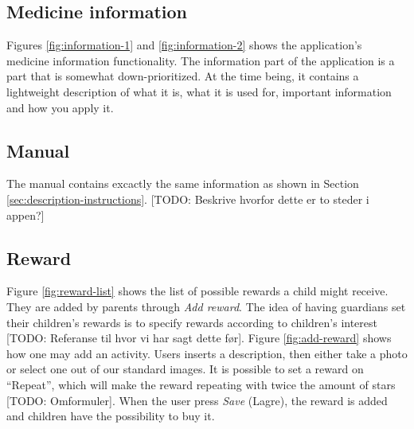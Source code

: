 \subsection{Medicine information}
\label{sec:description-medicine-information}
Figures \ref{fig:information-1} and \ref{fig:information-2} shows the application's medicine information functionality. The information part of the application is a part that is somewhat down-prioritized. At the time being, it contains a lightweight description of what it is, what it is used for, important information and how you apply it. 


\subsection{Manual}
\label{sec:description-manual}
The manual contains excactly the same information as shown in Section \ref{sec:description-instructions}. [TODO: Beskrive hvorfor dette er to steder i appen?]


\subsection{Reward}
\label{sec:description-manage-rewards}
Figure \ref{fig:reward-list} shows the list of possible rewards a child might receive. They are added by parents through \emph{Add reward}. The idea of having guardians set their children's rewards is to specify rewards according to children's interest [TODO: Referanse til hvor vi har sagt dette før]. Figure \ref{fig:add-reward} shows how one may add an activity. Users inserts a description, then either take a photo or select one out of our standard images. It is possible to set a reward on ``Repeat'', which will make the reward repeating with twice the amount of stars [TODO: Omformuler].        
When the user press \emph{Save} (Lagre), the reward is added and children have the possibility to buy it. 
 
